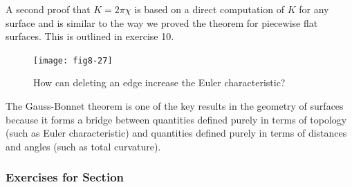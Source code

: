 \documentclass{book}
\begin{document}
A second proof that $K = 2 \pi \chi $ is based
on a direct computation of $K$ for any surface and is similar to the way
we proved the theorem for piecewise flat surfaces. This is outlined in
exercise 10.

\begin{figure}
\begin{center}
\texttt{[image: fig8-27]}
\caption{How can deleting an edge increase the Euler characteristic?}
\end{center}
\end{figure}

The Gauss-Bonnet theorem is one of the key results in the geometry
of surfaces because it forms a bridge between quantities defined purely
in terms of topology (such as Euler characteristic) and quantities defined
purely in terms of distances and angles (such as total curvature).

\subsubsection{Exercises for Section \thesection}
\end{document}
